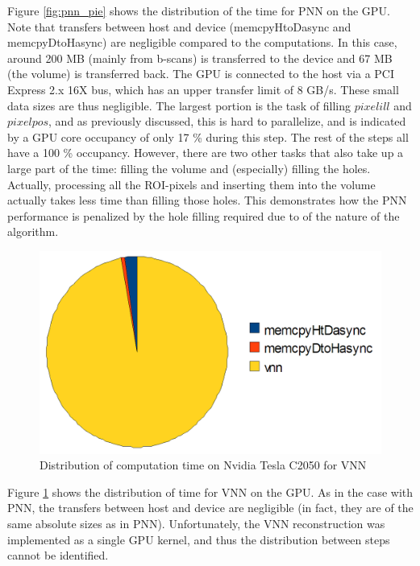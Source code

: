 	Figure \ref{fig:pnn_pie} shows the distribution of the time for PNN on the GPU. Note that transfers between host and device (memcpyHtoDasync and memcpyDtoHasync) are negligible compared to the computations. In this case, around 200 MB (mainly from b-scans) is transferred to the device and 67 MB (the volume) is transferred back. The GPU is connected to the host via a PCI Express 2.x 16X bus, which has an upper transfer limit of 8 GB/s. These small data sizes are thus negligible. The largest portion is the task of filling $pixelill$ and $pixelpos$, and as previously discussed, this is hard to parallelize, and is indicated by a GPU core occupancy of only 17 \% during this step. The rest of the steps all have a 100 \% occupancy. However, there are two other tasks that also take up a large part of the time: filling the volume and (especially) filling the holes. Actually, processing all the ROI-pixels and inserting them into the volume actually takes less time than filling those holes. This demonstrates how the PNN performance is penalized by the hole filling required due to of the nature of the algorithm.
	
	\begin{figure}[h]
	\centering
	\includegraphics[height=0.3\textheight]{charts/vnn.png}
	\caption[Distribution of computation time for VNN]{Distribution of computation time on Nvidia Tesla C2050 for VNN}
	\label{fig:vnn_pie}
	\end{figure}
	
	Figure \ref{fig:vnn_pie} shows the distribution of time for VNN on the GPU. As in the case with PNN, the transfers between host and device are negligible (in fact, they are of the same absolute sizes as in PNN). Unfortunately, the VNN reconstruction was implemented as a single GPU kernel, and thus the distribution between steps cannot be identified.
	

